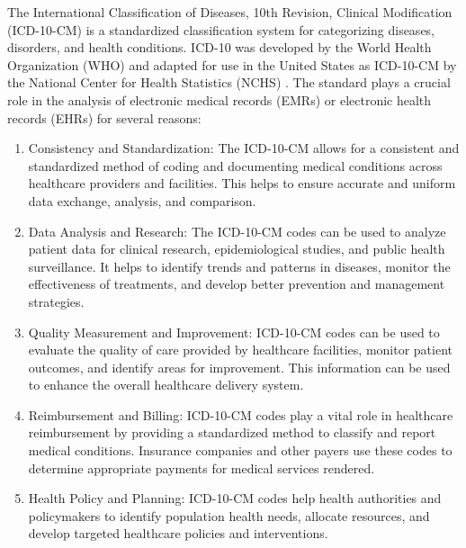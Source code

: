 \documentclass{bmcart}
\begin{document}
The International Classification of Diseases, 10th Revision, 
Clinical Modification (ICD-10-CM) \cite{icd10} is a 
standardized classification system 
for categorizing diseases, disorders, and health conditions. ICD-10 was 
developed by the World Health Organization (WHO) and adapted for use in the 
United States as ICD-10-CM by the National Center for Health 
Statistics (NCHS) \cite{icd10cm}. The standard plays a crucial role in 
the analysis of 
electronic medical records (EMRs) or electronic health records (EHRs) for 
several reasons:
\begin{enumerate}
\item{Consistency and Standardization: The ICD-10-CM allows for a consistent 
and standardized method of coding and documenting medical conditions across 
healthcare providers and facilities. This helps to ensure accurate and 
uniform data exchange, analysis, and comparison.}
\item{Data Analysis and Research: The ICD-10-CM codes can be used to analyze 
patient data for clinical research, epidemiological studies, and public health 
surveillance. It helps to identify trends and patterns in diseases, monitor 
the effectiveness of treatments, and develop better prevention and management 
strategies.}
\item{Quality Measurement and Improvement: ICD-10-CM codes can be used to 
evaluate the quality of care provided by healthcare facilities, monitor 
patient outcomes, and identify areas for improvement. This information can 
be used to enhance the overall healthcare delivery system.}
\item{Reimbursement and Billing: ICD-10-CM codes play a vital role in 
healthcare reimbursement by providing a standardized method to classify and 
report medical conditions. Insurance companies and other payers use these 
codes to determine appropriate payments for medical services rendered.}
\item{Health Policy and Planning: ICD-10-CM codes help health authorities and 
policymakers to identify population health needs, allocate resources, and 
develop targeted healthcare policies and interventions.}
\end{enumerate}
\end{document}
